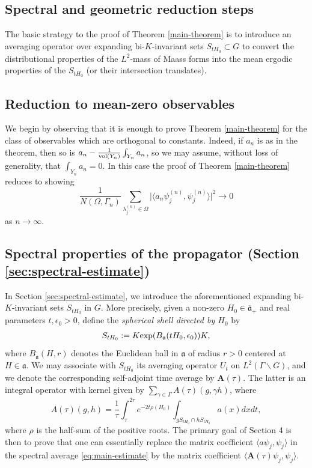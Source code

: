\documentclass[12pt]{amsart}
\theoremstyle{remark}
\newcommand{\ga}{\mathfrak a}
\begin{document}
\subsection{Spectral and geometric reduction steps}
The basic strategy to the proof of Theorem \ref{main-theorem} is to introduce an averaging operator over expanding bi-$K$-invariant sets $S_{tH_0}\subset G$ to convert the distributional properties of the $L^2$-mass of Maass forms into the mean ergodic properties of the $S_{tH_0}$ (or their intersection translates). 



\subsection*{Reduction to mean-zero observables}
We begin by observing that it is enough to prove Theorem \ref{main-theorem} for the class of observables which are orthogonal to constants. Indeed, if $a_n$ is as in the theorem, then so is $a_n-\frac{1}{{\rm vol}(Y_n)}\int_{Y_n} a_n$, so we may assume, without loss of generality, that $\int_{Y_n}a_n=0$. In this case the proof of Theorem \ref{main-theorem} reduces to showing
\begin{equation}\label{eq:main-estimate}
\frac{1}{N(\Omega, \Gamma_n)}\sum_{\lambda_j^{(n)}\in \Omega}\big|\langle a_n\psi_j^{(n)},\psi_j^{(n)}\rangle\big|^2\longrightarrow 0
\end{equation}
as $n\rightarrow\infty$.


\subsection*{Spectral properties of the propagator (Section \ref{sec:spectral-estimate})}

In Section \ref{sec:spectral-estimate}, we introduce the aforementioned expanding bi-$K$-invariant sets $S_{tH_0}$ in $G$. More precisely, given a non-zero $H_0 \in \overline{\mathfrak{a}}_+$ and real parameters $t,\epsilon_0>0$, define the \textit{spherical shell directed by $H_0$} by
\begin{gather*}
S_{tH_0} := K \textnormal{exp}(B_{\mathfrak{a}}(tH_0,\epsilon_0))K,
\end{gather*}
where $B_{\mathfrak{a}}(H, r)$ denotes the Euclidean ball in $\ga$ of radius $r > 0$ centered at $H \in \mathfrak{a}$. We may associate with $S_{tH_0}$ its averaging operator $U_t$ on $L^2(\Gamma\backslash G)$, and we denote the corresponding self-adjoint time average by $\mathbf{A}(\tau)$. The latter is an integral operator with kernel given by $\sum_{\gamma\in\Gamma} A(\tau)(g,\gamma h)$, where
\begin{equation}\label{intro-kernel}
A(\tau)(g,h)=\frac1{\tau}\int_{\tau}^{2\tau}e^{-2t\rho(H_0)}\int_{g S_{tH_0}\cap h S_{tH_0}}a(x) dx dt,
\end{equation}
where $\rho$ is the half-sum of the positive roots. The primary goal of Section 4 is then to prove that one can essentially replace the matrix coefficient $\langle a\psi_j,\psi_j\rangle$ in the spectral average \eqref{eq:main-estimate} by the matrix coefficient $\langle \mathbf{A}(\tau)\psi_j,\psi_j\rangle$.
\end{document}
